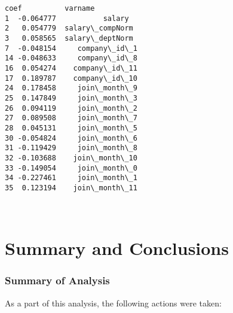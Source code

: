 \documentclass[11pt]{article}
\begin{document}
    \begin{Verbatim}[commandchars=\\\{\}]
        coef          varname
1  -0.064777           salary
2   0.054779  salary\_compNorm
3   0.058565  salary\_deptNorm
7  -0.048154     company\_id\_1
14 -0.048633     company\_id\_8
16  0.054274    company\_id\_11
17  0.189787    company\_id\_10
24  0.178458     join\_month\_9
25  0.147849     join\_month\_3
26  0.094119     join\_month\_2
27  0.089508     join\_month\_7
28  0.045131     join\_month\_5
30 -0.054824     join\_month\_6
31 -0.119429     join\_month\_8
32 -0.103688    join\_month\_10
33 -0.149054     join\_month\_0
34 -0.227461     join\_month\_1
35  0.123194    join\_month\_11

    \end{Verbatim}

    \begin{center}
    \end{center}
    { \hspace*{\fill} \\}
    
    \section{Summary and Conclusions}\label{summary-and-conclusions}

\subsubsection{Summary of Analysis}\label{summary-of-analysis}

As a part of this analysis, the following actions were taken:
\end{document}
